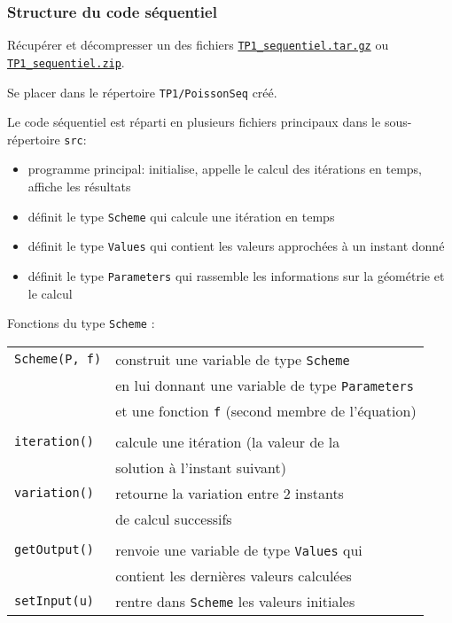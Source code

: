 \documentclass{beamer}
\begin{document}
\begin{frame}
	\frametitle{Structure du code séquentiel}
	
	Récupérer et décompresser un des fichiers \href{https://perso.ensta-paris.fr/~tajchman/Seance3/TP1_sequentiel.tar.gz}{\tt TP1\_sequentiel.tar.gz} ou \href{https://perso.ensta-paris.fr/~tajchman/Seance3/TP1_sequentiel.zip}{\tt TP1\_sequentiel.zip}.
	
    \medskip
	 Se placer dans le répertoire {\tt TP1/PoissonSeq} créé. 
	
	Le code séquentiel est réparti en plusieurs fichiers principaux dans le sous-répertoire {\tt src}:
    \medskip
    
	\hfill\begin{minipage}{8cm}
	\begin{itemize}
		\item[\textcolor{blue}{main.cxx}:] programme principal: initialise, appelle le calcul des itérations en temps, affiche les résultats 
		\item[\textcolor{blue}{scheme(.hxx/.cxx)}:] définit le type {\tt Scheme} qui calcule une itération en temps
		\item[\textcolor{blue}{values(.hxx/.cxx)}:] définit le type {\tt Values} qui contient les valeurs approchées à un instant donné
		\item[\textcolor{blue}{parameters(.hxx/.cxx)}:] définit le type {\tt Parameters} qui rassemble les informations sur la géométrie et le calcul
	\end{itemize}
    \end{minipage}
\vfill
\end{frame}

\begin{frame}
Fonctions du type {\tt Scheme} :
\bigskip

\begin{tabular}{ll}
{\tt Scheme(P, f)} & construit une variable de type {\tt Scheme} \\
& en lui donnant une variable de type {\tt Parameters} \\
& et une fonction {\tt f} (second membre de l'équation) \\ \\
{\tt iteration()} & calcule une itération (la valeur de la \\ 
& solution à l'instant suivant)\\
{\tt variation()} & retourne la variation entre 2 instants \\ 
& de calcul successifs\\ \\

{\tt getOutput()} & renvoie une variable de type {\tt Values} qui \\ & contient les dernières valeurs calculées \\
{\tt setInput(u)} & rentre dans {\tt Scheme} les valeurs initiales \\
\end{tabular}
	
\end{frame}
\end{document}
